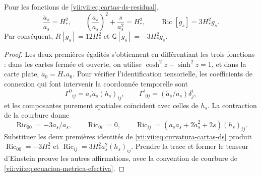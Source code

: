 \begin{lemma}
\label{vii:vii:lem:curvatura-cartas-ds}
Pour les fonctions de \eqref{vii:vii:eq:cartas-ds-residual},
\begin{equation}
 \frac{\ddot a_s}{a_s}=H_*^2,\qquad
 \left(\frac{\dot a_s}{a_s}\right)^2+\frac{s}{a_s^2}=H_*^2,
 \qquad
 \operatorname{Ric}[g_s]=3H_*^2g_s.
 \label{vii:vii:eq:curvatura-cartas-ds}
\end{equation}
Par conséquent, \(R[g_s]=12H_*^2\) et
\(\mathsf G[g_s]=-3H_*^2g_s\).
\end{lemma}
\begin{proof}
Les deux premières égalités s'obtiennent en différentiant les trois fonctions :
dans les cartes fermée et ouverte, on utilise
\(\cosh^2z-\sinh^2z=1\), et dans la carte plate,
\(\dot a_0=H_*a_0\). Pour vérifier l'identification tensorielle,
les coefficients de connexion qui font intervenir la coordonnée temporelle sont
\[
 \Gamma^0{}_{ij}=a_s\dot a_s(h_s)_{ij},\qquad
 \Gamma^i{}_{0j}=(\dot a_s/a_s)\delta^i_j,
\]
et les composantes purement spatiales coïncident avec celles de \(h_s\). La contraction de la courbure donne
\[
 \operatorname{Ric}_{00}=-3\ddot a_s/a_s,\qquad
 \operatorname{Ric}_{0i}=0,\qquad
 \operatorname{Ric}_{ij}
  =(a_s\ddot a_s+2\dot a_s^2+2s)(h_s)_{ij}.
\]
Substituer les deux premières identités de
\eqref{vii:vii:eq:curvatura-cartas-ds} produit
\(\operatorname{Ric}_{00}=-3H_*^2\) et
\(\operatorname{Ric}_{ij}=3H_*^2a_s^2(h_s)_{ij}\).
Prendre la trace et former le tenseur d'Einstein prouve les autres
affirmations, avec la convention de courbure de
\eqref{vii:vii:eq:ecuacion-metrica-efectiva}.
\end{proof}

